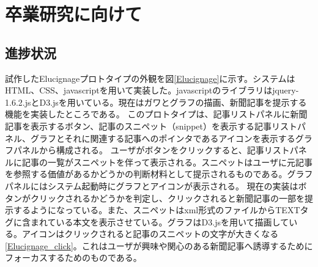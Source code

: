 \documentclass{matsushita-zemi}
\begin{document}
\section{卒業研究に向けて}

\subsection{進捗状況}
試作したElucignageプロトタイプの外観を図\ref{Elucignage}に示す。システムはHTML、CSS、javascriptを用いて実装した。javascriptのライブラリはjquery-1.6.2.jsとD3.jsを用いている。現在はガワとグラフの描画、新聞記事を提示する機能を実装したところである。
このプロトタイプは、記事リストパネルに新聞記事を表示するボタン、記事のスニペット（snippet）を表示する記事リストパネル、グラフとそれに関連する記事へのポインタであるアイコンを表示するグラフパネルから構成される。
ユーザがボタンをクリックすると、記事リストパネルに記事の一覧がスニペットを伴って表示される。スニペットはユーザに元記事を参照する価値があるかどうかの判断材料として提示されるものである。グラフパネルにはシステム起動時にグラフとアイコンが表示される。
現在の実装はボタンがクリックされるかどうかを判定し、クリックされると新聞記事の一部を提示するようになっている。また、スニペットはxml形式のファイルからTEXTタグに含まれている本文を表示させている。グラフはD3.jsを用いて描画している。アイコンはクリックされると記事のスニペットの文字が大きくなる\ref{Elucignage_click}。これはユーザが興味や関心のある新聞記事へ誘導するためにフォーカスするためのものである。
\end{document}
